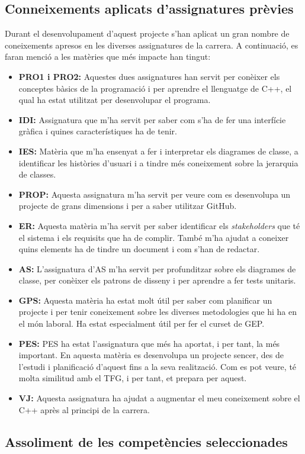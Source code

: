 \documentclass[a4paper]{article}
\begin{document}
\subsection{Conneixements aplicats d'assignatures prèvies}
Durant el desenvolupament d'aquest projecte s'han aplicat un gran nombre de coneixements apresos en les diverses assignatures de la carrera. A continuació, es faran menció a les matèries que més impacte han tingut:
\begin{itemize}
    \item \textbf{PRO1 i PRO2:} Aquestes dues assignatures han servit per conèixer els conceptes bàsics de la programació i per aprendre el llenguatge de C++, el qual ha estat utilitzat per desenvolupar el programa.
    \item \textbf{IDI:} Assignatura que m'ha servit per saber com s'ha de fer una interfície gràfica i quines característiques ha de tenir.
    \item \textbf{IES:} Matèria que m'ha ensenyat a fer i interpretar els diagrames de classe, a identificar les històries d'usuari i a tindre més coneixement sobre la jerarquia de classes.
    \item \textbf{PROP:} Aquesta assignatura m'ha servit per veure com es desenvolupa un projecte de grans dimensions i per a saber utilitzar GitHub.
    \item \textbf{ER:} Aquesta matèria m'ha servit per saber identificar els \textit{stakeholders} que té el sistema i els requisits que ha de complir. També m'ha ajudat a coneixer quins elements ha de tindre un document i com s'han de redactar.
    \item \textbf{AS:} L'assignatura d'AS m'ha servit per profunditzar sobre els diagrames de classe, per conèixer els patrons de disseny i per aprendre a fer tests unitaris.
    \item\textbf{GPS:} Aquesta matèria ha estat molt útil per saber com planificar un projecte i per tenir coneixement sobre les diverses metodologies que hi ha en el món laboral. Ha estat especialment útil per fer el curset de GEP.
    \item \textbf{PES:} PES ha estat l'assignatura que més ha aportat, i per tant, la més important. En aquesta matèria es desenvolupa un projecte sencer, des de l'estudi i planificació d'aquest fins a la seva realització. Com es pot veure, té molta similitud amb el TFG, i per tant, et prepara per aquest.
    \item \textbf{VJ:} Aquesta assignatura ha ajudat a augmentar el meu coneixement sobre el C++ après al principi de la carrera.
\end{itemize}

\subsection{Assoliment de les competències seleccionades}

\newpage
\nocite{*}
\printbibliography[heading=bibintoc]
\end{document}
